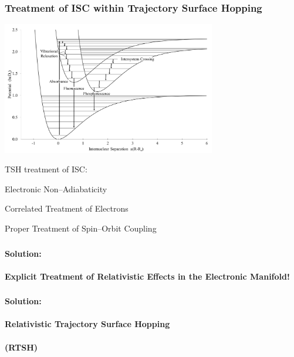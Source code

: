 \documentclass[usepdftitle=false,10pt]{beamer}
\newcommand{\cmark}{\color{green} \ding{51}}%
\newcommand{\xmark}{\color{red} \ding{55}}%
\newcommand{\done}{\rlap{$\square$}{\raisebox{2pt}{\large\hspace{1pt}\cmark}}%
\hspace{-2.5pt}}
\newcommand{\wontfix}{\rlap{$\square$}{\large\hspace{1pt}\xmark}}
\begin{document}
\begin{frame}
  \frametitle{Treatment of ISC within Trajectory Surface Hopping}
  \begin{center}
  \includegraphics[width=0.7\textwidth]{ISC} 
  \end{center}
  \vspace{-0.5cm}
  TSH treatment of ISC: 
  \begin{mylist}
    \item[\done] Electronic Non--Adiabaticity
    \item[\done] Correlated Treatment of Electrons
    \item[\wontfix] Proper Treatment of Spin--Orbit Coupling
  \end{mylist}
\end{frame}

\begin{frame}
  \frametitle{}
  \begin{center}
  {\LARGE \bf Solution: \\~\\ Explicit Treatment of Relativistic Effects in the Electronic Manifold!}
  \end{center}
\end{frame}

\begin{frame}
  \frametitle{}
  \begin{center}
  {\LARGE \bf Solution: \\~\\ Relativistic Trajectory Surface Hopping \\~\\(RTSH)}
  \end{center}
\end{frame}
\end{document}
